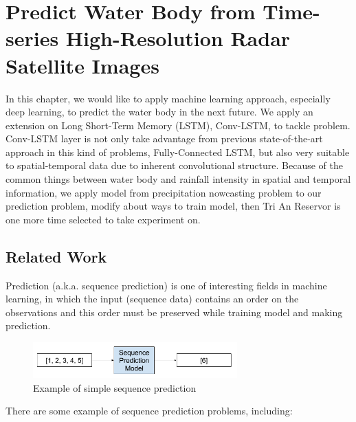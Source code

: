 \chapter{Predict Water Body from Time-series High-Resolution Radar Satellite Images}
\label{chap-5-predict-from-sar-image}
\begin{ChapAbstract}
In this chapter, we would like to apply machine learning approach, especially deep learning, to predict the water body in the next future. We apply an extension on Long Short-Term Memory (LSTM), Conv-LSTM, to tackle problem. Conv-LSTM layer is not only take advantage from previous state-of-the-art approach in this kind of problems, Fully-Connected LSTM, but also very suitable to spatial-temporal data due to inherent convolutional structure. Because of the common things between water body and rainfall intensity in spatial and temporal information, we apply model from precipitation nowcasting problem to our prediction problem, modify about ways to train model, then Tri An Reservor is one more time selected to take experiment on. 

\end{ChapAbstract}

\section{Related Work}


Prediction (a.k.a. sequence prediction) is one of interesting fields in machine learning, in which the input (sequence data) contains an order on the observations and this order must be preserved while training model and making prediction.

\begin{figure}[h!]
	\centering
	\includegraphics[width=0.7\textwidth]{figures/Example-of-a-Sequence-Prediction-Problem.png}
	\caption{Example of simple sequence prediction}
	\label{fig:exampleSimpleSequencePrediction}
\end{figure}

There are some example of sequence prediction problems, including:


